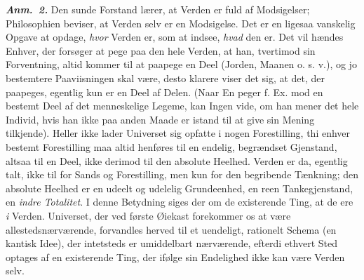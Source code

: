 \documentclass[12pt]{book}
\newcommand{\anm}[1]{\emph{\textbf{Anm.~#1.}}}
\newcommand{\opage}[1]{\marginnote{\footnotesize\textit{[#1]}}}
\begin{document}
\anm{2} Den sunde Forstand lærer, at Verden er fuld af Modsigelser; Philosophien beviser, at
Verden selv er en Modsigelse. Det er en ligesaa vanskelig Opgave at opdage, \emph{hvor} Verden
er, som at indsee, \emph{hvad} den er. Det vil hændes Enhver, der forsøger at pege paa den hele
Verden, at han, tvertimod sin Forventning, altid kommer til at paapege en Deel (Jorden, Maanen
o. s. v.), og jo bestemtere Paaviisningen skal være, desto klarere viser det sig, at det, der
paapeges, egentlig kun er en Deel af Delen. (Naar En peger f. Ex. mod en bestemt Deel af det
menneskelige Legeme, kan Ingen vide, om han mener det hele Individ, hvis han ikke paa anden
Maade er istand til at give sin Mening tilkjende). Heller ikke lader Universet sig opfatte i
nogen Forestilling, thi enhver bestemt Forestilling maa altid henføres til en endelig,
begrændset Gjenstand, altsaa til en Deel, ikke derimod til den absolute Heelhed. Verden er da,
egentlig talt, ikke til for Sands og Forestilling, men kun for den begribende Tænkning; den
absolute Heelhed er en udeelt og udelelig Grundeenhed, en reen Tankegjenstand, en \emph{indre
Totalitet}. I denne Betydning siges der om de existerende Ting, at de ere \emph{i} Verden.
Universet, der ved første Øiekast forekommer os at være allestedsnærværende, forvandles herved
til et uendeligt, rationelt Schema (en kantisk Idee), der intetsteds er umiddelbart nærværende,
efterdi ethvert Sted optages af en existerende Ting, der ifølge sin Endelighed ikke kan være
Verden selv.
\opage{138} %
\end{document}
